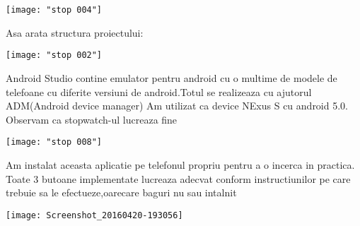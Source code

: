 \begin{center}
\texttt{[image: "stop 004"]}
\end{center}


Asa arata structura proiectului:

\begin{center}
\texttt{[image: "stop 002"]}
\end{center}



Android Studio contine emulator pentru android cu o multime de modele de telefoane cu diferite versiuni de android.Totul se realizeaza cu ajutorul ADM(Android device manager)
Am utilizat ca device NExus S cu android 5.0.
Observam ca stopwatch-ul lucreaza fine
\begin{center}
\texttt{[image: "stop 008"]}
\end{center}

Am instalat aceasta aplicatie pe telefonul propriu pentru a o incerca in practica.
Toate 3 butoane implementate lucreaza adecvat conform instructiunilor pe care trebuie sa le efectueze,oarecare baguri nu sau intalnit
\begin{center}
\texttt{[image: Screenshot\_20160420-193056]}
\end{center}




\clearpage



